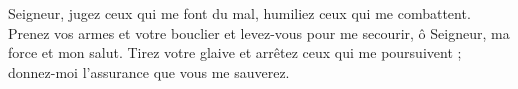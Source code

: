 Seigneur, jugez ceux qui me font du mal, humiliez ceux qui me combattent. Prenez vos armes et votre bouclier et levez-vous pour me secourir, ô Seigneur, ma force et mon salut.
\versseparator
Tirez votre glaive et arrêtez ceux qui me poursuivent ; donnez-moi l’assurance que vous me sauverez.
